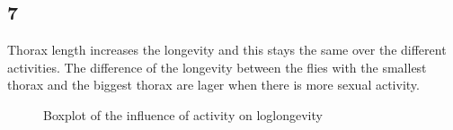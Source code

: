 \documentclass{article}
\begin{document}
    \subsection*{7}
      Thorax length increases the longevity and this stays the same over the different activities.
      The difference of the longevity between the flies with the smallest thorax and the biggest thorax are lager when there is more sexual activity.
      \begin{figure}[H]
          \centering
          \caption{Boxplot of the influence of activity on loglongevity}
          \label{fig:BoxActivity}
      \end{figure}
\end{document}
